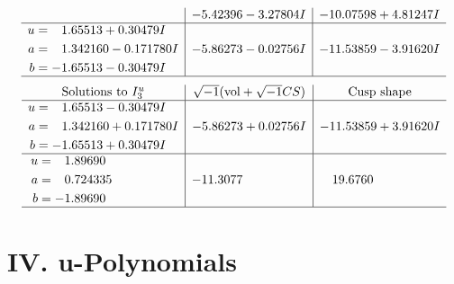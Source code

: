 \documentclass[1p]{elsarticle_modified}
\theoremstyle{definition}
\newcommand{\I}{\sqrt{-1}}
\begin{document}
$$\begin{array}{c|c|c}
 & -5.42396 - 3.27804 I & -10.07598 + 4.81247 I \\ \hline\begin{aligned}
u &= \phantom{-}1.65513 + 0.30479 I \\
a &= \phantom{-}1.342160 - 0.171780 I \\
b &= -1.65513 - 0.30479 I\end{aligned}
 & -5.86273 - 0.02756 I & -11.53859 - 3.91620 I\\
 \hline 
 \end{array}$$\newpage$$\begin{array}{c|c|c}  
\text{Solutions to }I^u_{3}& \I (\text{vol} + \sqrt{-1}CS) & \text{Cusp shape}\\
 \hline 
\begin{aligned}
u &= \phantom{-}1.65513 - 0.30479 I \\
a &= \phantom{-}1.342160 + 0.171780 I \\
b &= -1.65513 + 0.30479 I\end{aligned}
 & -5.86273 + 0.02756 I & -11.53859 + 3.91620 I \\ \hline\begin{aligned}
u &= \phantom{-}1.89690\phantom{ +0.000000I} \\
a &= \phantom{-}0.724335\phantom{ +0.000000I} \\
b &= -1.89690\phantom{ +0.000000I}\end{aligned}
 & -11.3077\phantom{ +0.000000I} & \phantom{-}19.6760\phantom{ +0.000000I}\\
 \hline 
 \end{array}$$\newpage
\newpage\renewcommand{\arraystretch}{1}
\centering \section*{ IV. u-Polynomials}
\end{document}
